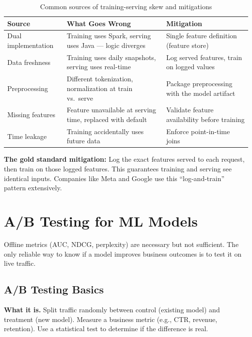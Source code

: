 \begin{table}[H]
\centering
\caption{Common sources of training-serving skew and mitigations}
\begin{tabularx}{\textwidth}{lXX}
\toprule
\textbf{Source} & \textbf{What Goes Wrong} & \textbf{Mitigation} \\
\midrule
Dual implementation & Training uses Spark, serving uses Java --- logic diverges & Single feature definition (feature store) \\
Data freshness & Training uses daily snapshots, serving uses real-time & Log served features, train on logged values \\
Preprocessing & Different tokenization, normalization at train vs.\ serve & Package preprocessing with the model artifact \\
Missing features & Feature unavailable at serving time, replaced with default & Validate feature availability before training \\
Time leakage & Training accidentally uses future data & Enforce point-in-time joins \\
\bottomrule
\end{tabularx}
\end{table}

\textbf{The gold standard mitigation:} Log the exact features served to each request, then train on those logged features. This guarantees training and serving see identical inputs. Companies like Meta and Google use this ``log-and-train'' pattern extensively.

\section{A/B Testing for ML Models}
\label{sec:ab_testing}

Offline metrics (AUC, NDCG, perplexity) are necessary but not sufficient. The only reliable way to know if a model improves business outcomes is to test it on live traffic.

\subsection{A/B Testing Basics}

\textbf{What it is.} Split traffic randomly between control (existing model) and treatment (new model). Measure a business metric (e.g., CTR, revenue, retention). Use a statistical test to determine if the difference is real.

